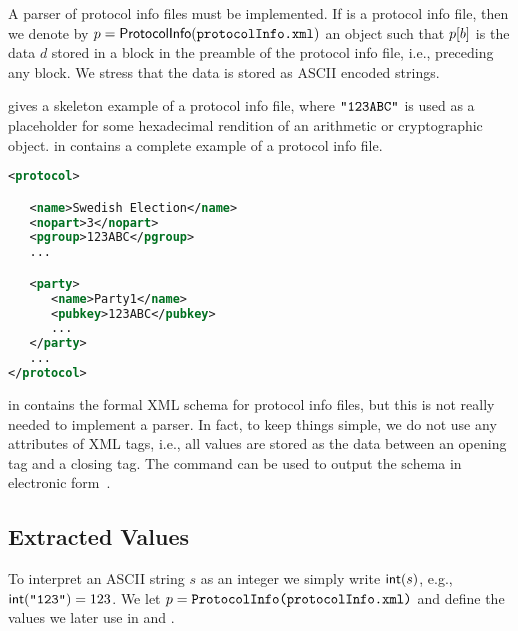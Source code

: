 \documentclass[11pt]{article}
\begin{document}
A parser of protocol info files must be implemented. If
 is a protocol info file, then we denote by
$p=\textsf{ProtocolInfo}(\texttt{protocolInfo.xml})$ an object such that
$p[b]$ is the data $d$ stored in a block 
in the preamble of the protocol info file, i.e., preceding any
 block. We stress that the data is stored as
ASCII encoded strings.

 gives a skeleton example of a protocol info
file, where $\texttt{"123ABC"}$ is used as a placeholder for some
hexadecimal rendition of an arithmetic or cryptographic
object.  in  contains a
complete example of a protocol info file.

\begin{lstlisting}[frame=single,language=xml,
basicstyle=\tt\xmlfontsize,captionpos=b,
float=h,
caption={Skeleton of a protocol info file. There are no nested blocks within a \xml{<party></party>} block.},label=list:infofileskel]
<protocol>

   <name>Swedish Election</name>
   <nopart>3</nopart>
   <pgroup>123ABC</pgroup>
   ...

   <party>
      <name>Party1</name>
      <pubkey>123ABC</pubkey>
      ...
   </party>
   ...
</protocol>
\end{lstlisting}

 in  contains the
formal XML schema for protocol info files, but this is not really
needed to implement a parser. In fact, to keep things simple, we do
not use any attributes of XML tags, i.e., all values are stored as the
data between an opening tag and a closing tag. The  command
can be used to output the schema in electronic form~\cite{vmnum}.

\subsection{Extracted Values}\label{sect:extracted}

To interpret an ASCII string $s$ as an integer we simply write
$\textsf{int}(s)$, e.g., $\textsf{int}(\texttt{"123"})=123$. We let
$p=\texttt{ProtocolInfo(protocolInfo.xml)}$ and define the values we
later use in  and .
\end{document}

